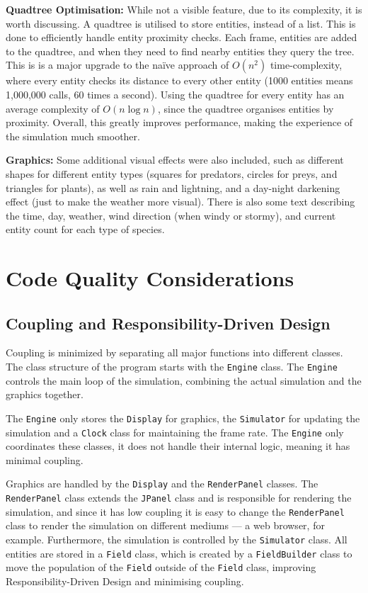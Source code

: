 \documentclass[10pt, a4paper]{scrartcl}
\begin{document}
\begin{multicols}{2}
        \noindent \textbf{Quadtree Optimisation: } While not a visible feature, due to its complexity, it is worth discussing.
        A quadtree is utilised to store entities, instead of a list. This is done to efficiently handle entity proximity checks. Each frame,
        entities are added to the quadtree, and when they need to find nearby entities they query the tree. This is is a major upgrade
        to the naïve approach of $O(n^2)$ time-complexity, where every entity checks its distance to every other entity (1000 entities means
        1,000,000 calls, 60 times a second). Using the quadtree for every entity has an average complexity of $O(n \log n)$, since the
        quadtree organises entities by proximity. Overall, this greatly improves performance, making the experience of the simulation
        much smoother.

        \noindent \textbf{Graphics: } Some additional visual effects were also included, such as different shapes for different entity types
        (squares for predators, circles for preys, and triangles for plants), as well as rain and lightning, and a day-night darkening effect
        (just to make the weather more visual). There is also some text describing the time, day, weather, wind direction (when windy or
        stormy), and current entity count for each type of species.

        \section{Code Quality Considerations}

        \subsection{Coupling and Responsibility-Driven Design}
        \noindent Coupling is minimized by separating all major functions into different classes. The class structure of the
        program starts with the \verb|Engine| class. The \verb|Engine| controls the main loop of the simulation, combining the actual
        simulation and the graphics together.

        \noindent The \verb|Engine| only stores the \verb|Display| for graphics, the \verb|Simulator| for updating the simulation and a
        \verb|Clock| class for maintaining the frame rate. The \verb|Engine| only coordinates these classes, it does not handle their
        internal logic, meaning it has minimal coupling.

        \noindent Graphics are handled by the \verb|Display| and the \verb|RenderPanel| classes. The \verb|RenderPanel| class 
        extends the \verb|JPanel| class and is responsible for rendering the simulation, and since it has low coupling it is 
        easy to change the \verb|RenderPanel| class to render the simulation on different mediums — a web browser, for example.
        Furthermore, the simulation is controlled by the
        \verb|Simulator| class. All entities are stored in a \verb|Field| class, which is created by a \verb|FieldBuilder| class to
        move the population of the \verb|Field| outside of the \verb|Field| class, improving Responsibility-Driven Design and
        minimising coupling.


\end{multicols}
\end{document}
